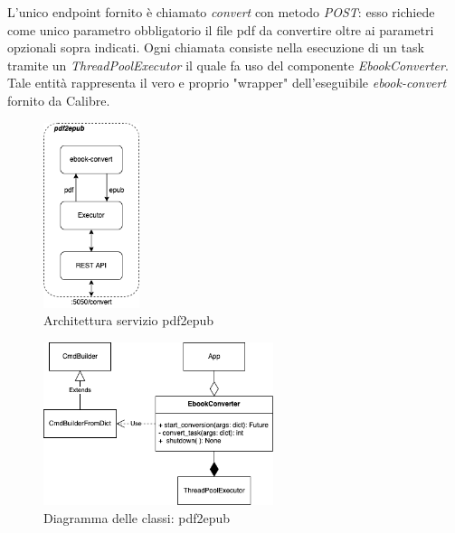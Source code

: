 L'unico endpoint fornito è chiamato \textit{convert} con metodo \textit{POST}: esso richiede come unico parametro obbligatorio il file pdf da convertire oltre ai parametri opzionali sopra indicati. Ogni chiamata consiste nella esecuzione di un task tramite un \textit{ThreadPoolExecutor} il quale fa uso del componente \textit{EbookConverter}. Tale entità rappresenta il vero e proprio "wrapper" dell'eseguibile \textit{ebook-convert} fornito da Calibre.
\begin{figure}[H]
\centering
\includegraphics[width=0.25\textwidth]{img/tesi-4-pdf2epub.drawio.png}
\caption{Architettura servizio pdf2epub}
\end{figure}
\begin{figure}[H]
\centering
\includegraphics[width=0.6\textwidth]{img/tesi-5-pdf2epub.drawio.png}
\caption{Diagramma delle classi: pdf2epub}
\end{figure}

